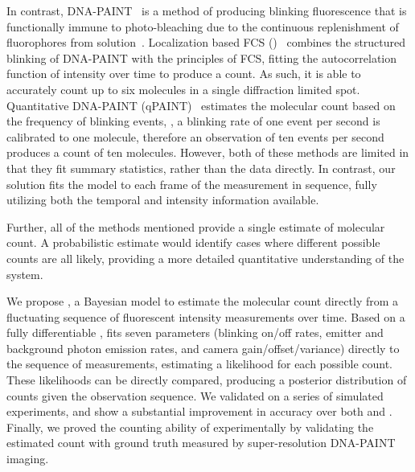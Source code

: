 %
In contrast, DNA-PAINT~\citep{schnitzbauer_2017} is a method of producing
blinking fluorescence that is functionally immune to photo-bleaching due to the
continuous replenishment of fluorophores from solution~\citep{stehr_2021}.
  Localization based FCS (\lbfcs)~\citep{stein_2019,stein_2021} combines the
  structured blinking of DNA-PAINT with the principles of FCS, fitting the
  autocorrelation function of intensity over time to produce a count. As such,
  it is able to accurately count up to six molecules in a single diffraction
  limited spot.
  Quantitative DNA-PAINT (qPAINT)~\citep{jungmann_2016} estimates the molecular
  count based on the frequency of blinking events, \ie, a blinking rate of one
  event per second is calibrated to one molecule, therefore an observation of
  ten events per second produces a count of ten molecules.
  However, both of these methods are limited in that they fit summary
  statistics, rather than the data directly.
  In contrast, our solution fits the model to each frame of the measurement 
  in sequence, fully utilizing both the temporal and intensity information available.
  
Further, all of the methods mentioned provide a single estimate of molecular count. 
  A probabilistic estimate would identify cases where different possible counts are all likely,
  providing a more detailed quantitative understanding of the system. 

We propose \ours, a Bayesian model to estimate the molecular count
directly from a fluctuating sequence of fluorescent intensity measurements over
time.
  Based on a fully differentiable \hmm, \ours fits
  seven parameters (blinking on/off rates, emitter and background photon emission rates, 
  and camera gain/offset/variance) directly to the sequence of measurements, 
  estimating a likelihood for each possible count.
  These likelihoods can be directly compared, producing a posterior
  distribution of counts given the observation sequence.
  We validated \ours on a series of simulated experiments, and show a
  substantial improvement in accuracy over both \lbfcs and \qpaint.
  Finally, we proved the counting ability of \ours experimentally by validating 
  the estimated count with ground truth measured by super-resolution DNA-PAINT imaging.

